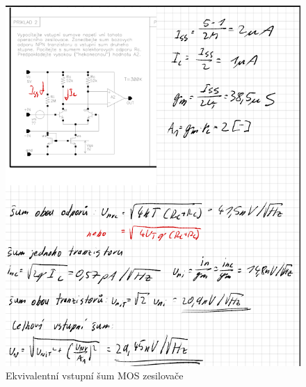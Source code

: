 \begin{figure}[h]
   \begin{center}
     \includegraphics[scale=0.7]{images/vstupMOS2.png}
   \end{center}
   \caption{Ekvivalentní vstupní šum MOS zesilovače}
\end{figure}



